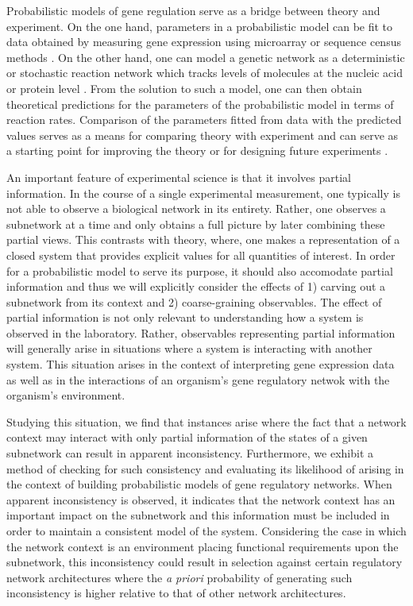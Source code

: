 Probabilistic models of gene regulation serve as a bridge between theory and experiment.  On the one hand, parameters in a probabilistic model can be fit to data obtained by measuring gene expression using microarray or sequence census methods \cite{Friedman2008a,Zhang2013}.  On the other hand, one can model a genetic network as a deterministic or stochastic reaction network which tracks levels of molecules at the nucleic acid or protein level \cite{Alon2006,Voit2012}.  From the solution to such a model, one can then obtain theoretical predictions for the parameters of the probabilistic model in terms of reaction rates.  Comparison of the parameters fitted from data with the predicted values serves as a means for comparing theory with experiment and can serve as a starting point for improving the theory or for designing future experiments \cite{Tonsing2014}.

An important feature of experimental science is that it involves partial information.  In the course of a single experimental measurement, one typically is not able to observe a biological network in its entirety.  Rather, one observes a subnetwork at a time and only obtains a full picture by later combining these partial views.  This contrasts with theory, where, one makes a representation of a closed system that provides explicit values for all quantities of interest.  In order for a probabilistic model to serve its purpose, it should also accomodate partial information and thus we will explicitly consider the effects of 1) carving out a subnetwork from its context and 2) coarse-graining observables. The effect of partial information is not only relevant to understanding how a system is observed in the laboratory.  Rather, observables representing partial information will generally arise in situations where a system is interacting with another system. This situation arises in the context of interpreting gene expression data as well as in the interactions of an organism's gene regulatory netwok with the organism's environment.

Studying this situation, we find that instances arise where the fact that a network context may interact with only partial information of the states of a given subnetwork can result in apparent inconsistency. Furthermore, we exhibit a method of checking for such consistency and evaluating its likelihood of arising in the context of building probabilistic models of gene regulatory networks. When apparent inconsistency is observed, it indicates that the network context has an important impact on the subnetwork and this information must be included in order to maintain a consistent model of the system. Considering the case in which the network context is an environment placing functional requirements upon the subnetwork, this inconsistency could result in selection against certain regulatory network architectures where the \emph{a priori} probability of generating such inconsistency is higher relative to that of other network architectures.

